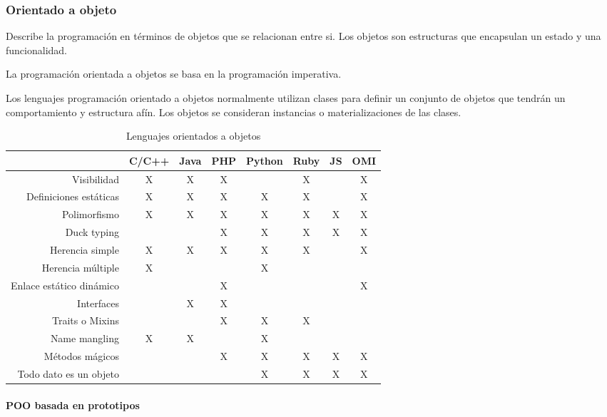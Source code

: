 \subsubsection{Orientado a objeto}
Describe la programación en términos de objetos que se relacionan entre si. Los objetos son 
estructuras que encapsulan un estado y una funcionalidad. 

La programación orientada a objetos se basa en la programación imperativa.

Los lenguajes programación orientado a objetos normalmente utilizan clases 
para definir un conjunto de objetos que tendrán un comportamiento y estructura afín. 
Los objetos se consideran instancias o materializaciones de las clases.


\FloatBarrier
\begin{table}[h]
\begin{center}
 
\begin{tabular}{|r|c|c|c|c|c|c|c|} \hline
 & C/C++ & Java & PHP  & Python & Ruby & JS & OMI\\ \hline
Visibilidad & X & X & X &  & X &  & X \\ \hline
Definiciones estáticas & X & X & X & X & X &  & X \\ \hline
Polimorfismo & X & X & X & X & X & X & X \\ \hline
Duck typing & & & X & X & X & X & X \\ \hline
Herencia simple  & X & X & X & X & X &  & X \\ \hline
Herencia múltiple  & X & &  & X &  &  &  \\ \hline
Enlace estático dinámico & & & X &  &  &  &  X \\ \hline
Interfaces & & X & X &  &  &  &   \\ \hline
Traits o Mixins & & & X & X & X &  &   \\ \hline
Name mangling & X & X & & X & & &  \\ \hline
Métodos mágicos & & & X & X & X & X & X \\ \hline 
Todo dato es un objeto & & &  & X & X & X & X \\ \hline 
\end{tabular}
\caption{Lenguajes orientados a objetos}
\end{center}
\end{table}
\FloatBarrier

\paragraph{POO basada en prototipos}

